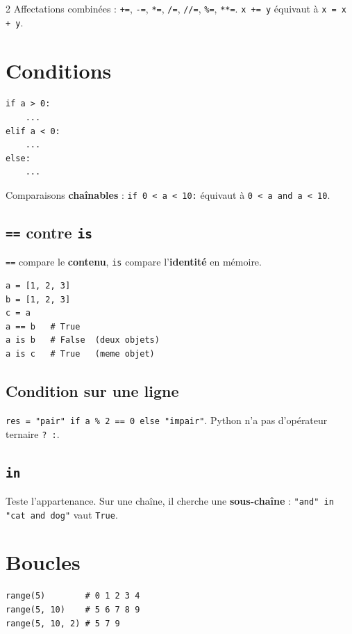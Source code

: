 \documentclass[a4paper,10pt]{article}
\newcommand{\co}[1]{\texttt{\textcolor{codefg}{#1}}}
\begin{document}
\begin{multicols}{2}
\vspace{0.4em}
Affectations combinées : \co{+=}, \co{-=}, \co{*=}, \co{/=}, \co{//=},
\co{\%=}, \co{**=}. \co{x += y} équivaut à \co{x = x + y}.

\section{Conditions}

\begin{lstlisting}
if a > 0:
    ...
elif a < 0:
    ...
else:
    ...
\end{lstlisting}

Comparaisons \textbf{chaînables} : \co{if 0 < a < 10:} équivaut à
\co{0 < a and a < 10}.

\subsection{\co{==} contre \co{is}}
\co{==} compare le \textbf{contenu}, \co{is} compare l'\textbf{identité} en
mémoire.

\begin{lstlisting}
a = [1, 2, 3]
b = [1, 2, 3]
c = a
a == b   # True
a is b   # False  (deux objets)
a is c   # True   (meme objet)
\end{lstlisting}

\subsection{Condition sur une ligne}
\co{res = "pair" if a \% 2 == 0 else "impair"}. Python n'a pas d'opérateur
ternaire \co{? :}.

\subsection{\co{in}}
Teste l'appartenance. Sur une chaîne, il cherche une \textbf{sous-chaîne} :
\co{"and" in "cat and dog"} vaut \co{True}.

\section{Boucles}

\begin{lstlisting}
range(5)        # 0 1 2 3 4
range(5, 10)    # 5 6 7 8 9
range(5, 10, 2) # 5 7 9
\end{lstlisting}


\end{multicols}
\end{document}
